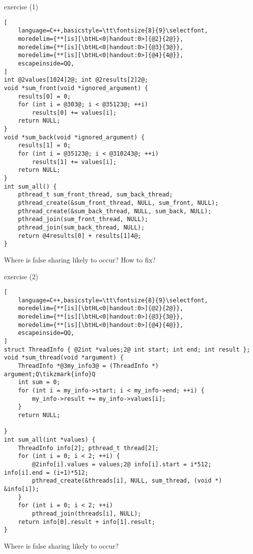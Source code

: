 \begin{frame}[fragile,label=falseSharingEx1]{exercise (1)}
\begin{lstlisting}[
    language=C++,basicstyle=\tt\fontsize{8}{9}\selectfont,
    moredelim={**[is][\btHL<0|handout:0>]{@2}{2@}},
    moredelim={**[is][\btHL<0|handout:0>]{@3}{3@}},
    moredelim={**[is][\btHL<0|handout:0>]{@4}{4@}},
    escapeinside=QQ,
]
int @2values[1024]2@; int @2results[2]2@;
void *sum_front(void *ignored_argument) {
    results[0] = 0;
    for (int i = @303@; i < @35123@; ++i)
        results[0] += values[i];
    return NULL;
}
void *sum_back(void *ignored_argument) {
    results[1] = 0;
    for (int i = @35123@; i < @310243@; ++i)
        results[1] += values[i];
    return NULL;
}
int sum_all() {
    pthread_t sum_front_thread, sum_back_thread;
    pthread_create(&sum_front_thread, NULL, sum_front, NULL);
    pthread_create(&sum_back_thread, NULL, sum_back, NULL);
    pthread_join(sum_front_thread, NULL);
    pthread_join(sum_back_thread, NULL);
    return @4results[0] + results[1]4@;
}
\end{lstlisting}
Where is false sharing likely to occur? How to fix?
\end{frame}

\begin{frame}[fragile,label=falseSharingEx2]{exercise (2)}
\begin{lstlisting}[
    language=C++,basicstyle=\tt\fontsize{8}{9}\selectfont,
    moredelim={**[is][\btHL<0|handout:0>]{@2}{2@}},
    moredelim={**[is][\btHL<0|handout:0>]{@3}{3@}},
    moredelim={**[is][\btHL<0|handout:0>]{@4}{4@}},
    escapeinside=QQ,
]
struct ThreadInfo { @2int *values;2@ int start; int end; int result };
void *sum_thread(void *argument) {
    ThreadInfo *@3my_info3@ = (ThreadInfo *) argument;Q\tikzmark{info}Q
    int sum = 0;
    for (int i = my_info->start; i < my_info->end; ++i) {
        my_info->result += my_info->values[i];
    }
    return NULL;

}
int sum_all(int *values) {
    ThreadInfo info[2]; pthread_t thread[2];
    for (int i = 0; i < 2; ++i) {
        @2info[i].values = values;2@ info[i].start = i*512; info[i].end = (i+1)*512;
        pthread_create(&threads[i], NULL, sum_thread, (void *) &info[i]);
    }
    for (int i = 0; i < 2; ++i)
        pthread_join(threads[i], NULL);
    return info[0].result + info[1].result;
}
\end{lstlisting}
Where is false sharing likely to occur?
\end{frame}
